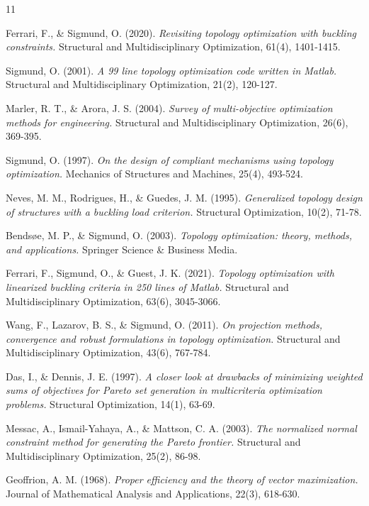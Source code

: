 \documentclass{article}
\begin{document}
\begin{thebibliography}{11}

 Ferrari, F., \& Sigmund, O. (2020). \textit{Revisiting topology optimization with buckling constraints.} Structural and Multidisciplinary Optimization, 61(4), 1401-1415.

 Sigmund, O. (2001). \textit{A 99 line topology optimization code written in Matlab.} Structural and Multidisciplinary Optimization, 21(2), 120-127.

 Marler, R. T., \& Arora, J. S. (2004). \textit{Survey of multi-objective optimization methods for engineering.} Structural and Multidisciplinary Optimization, 26(6), 369-395.

 Sigmund, O. (1997). \textit{On the design of compliant mechanisms using topology optimization.} Mechanics of Structures and Machines, 25(4), 493-524.

 Neves, M. M., Rodrigues, H., \& Guedes, J. M. (1995). \textit{Generalized topology design of structures with a buckling load criterion.} Structural Optimization, 10(2), 71-78.

 Bends\o e, M. P., \& Sigmund, O. (2003). \textit{Topology optimization: theory, methods, and applications.} Springer Science \& Business Media.

 Ferrari, F., Sigmund, O., \& Guest, J. K. (2021). \textit{Topology optimization with linearized buckling criteria in 250 lines of Matlab.} Structural and Multidisciplinary Optimization, 63(6), 3045-3066.

 Wang, F., Lazarov, B. S., \& Sigmund, O. (2011). \textit{On projection methods, convergence and robust formulations in topology optimization.} Structural and Multidisciplinary Optimization, 43(6), 767-784.

 Das, I., \& Dennis, J. E. (1997). \textit{A closer look at drawbacks of minimizing weighted sums of objectives for Pareto set generation in multicriteria optimization problems.} Structural Optimization, 14(1), 63-69.

 Messac, A., Ismail-Yahaya, A., \& Mattson, C. A. (2003). \textit{The normalized normal constraint method for generating the Pareto frontier.} Structural and Multidisciplinary Optimization, 25(2), 86-98.

 Geoffrion, A. M. (1968). \textit{Proper efficiency and the theory of vector maximization.} Journal of Mathematical Analysis and Applications, 22(3), 618-630.

\end{thebibliography}
\end{document}
